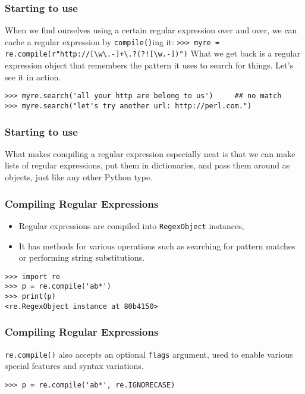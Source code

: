  \begin{frame}[fragile]
\frametitle{Starting to use}
When we find ourselves using a certain regular expression over and
over, we can cache a regular expression by \lstinline{compile()}ing it: \lstinline|>>> myre = re.compile(r"http://[\w\.-]+\.?(?![\w.-])")|
What we get back is a regular expression object that remembers the
pattern it uses to search for things.  Let's see it in action.
\begin{lstlisting}
>>> myre.search('all your http are belong to us')     ## no match
>>> myre.search("let's try another url: http://perl.com.")
\end{lstlisting}

\end{frame}

 \begin{frame}[fragile]
\frametitle{Starting to use}
What makes compiling a regular expression especially neat is that we
can make lists of regular expressions, put them in dictionaries, and
pass them around as objects, just like any other Python type.
\end{frame}


 \begin{frame}[fragile]
\frametitle{Compiling Regular Expressions } 

\begin{itemize}
\item Regular expressions are compiled into \lstinline|RegexObject| instances,
\item It has methods for various operations such as searching for
pattern matches or performing string substitutions.
\end{itemize}
\begin{lstlisting}
>>> import re
>>> p = re.compile('ab*')
>>> print(p)
<re.RegexObject instance at 80b4150>
\end{lstlisting}
\end{frame}

 \begin{frame}[fragile]
\frametitle{Compiling Regular Expressions } 
 \lstinline{re.compile()} also accepts an optional \lstinline{flags}
argument, used to enable various special features and syntax
variations.  

\begin{lstlisting}
>>> p = re.compile('ab*', re.IGNORECASE)
\end{lstlisting}
\end{frame}

